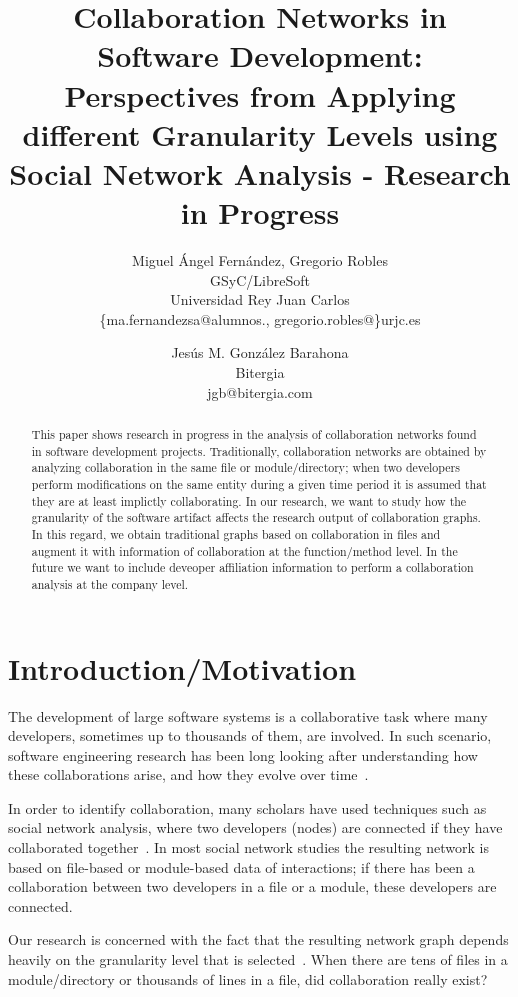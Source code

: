 \documentclass[a4paper]{article}
\title{Collaboration Networks in Software Development: Perspectives from Applying different Granularity Levels using Social Network Analysis - Research in Progress}
\author{
Miguel Ángel Fernández, Gregorio Robles \\ GSyC/LibreSoft \\
                Universidad Rey Juan Carlos \\ \{ma.fernandezsa@alumnos., gregorio.robles@\}urjc.es
\and
Jesús M. González Barahona \\ Bitergia \\
                jgb@bitergia.com
}
\begin{document}
\maketitle

\begin{abstract}
This paper shows research in progress in the analysis of collaboration networks
found in software development projects. Traditionally, collaboration networks
are obtained by analyzing collaboration in the same file or module/directory;
when two developers perform modifications on the same entity during a given time
period it is assumed that they are at least implictly collaborating. In our 
research, we want to study how the granularity of the software artifact affects
the research output of collaboration graphs. In this regard, we obtain traditional
graphs based on collaboration in files and augment it with information of
collaboration at the function/method level. In the future we want to include
deveoper affiliation information to perform a collaboration analysis at the
company level.
\end{abstract}
\vskip 32pt


\section{Introduction/Motivation}

The development of large software systems is a collaborative task where
many developers, sometimes up to thousands of them, are involved. In such 
scenario, software engineering research has been long looking after
understanding how these collaborations arise, and how they evolve over time~\cite{minto2007recommending,singh2010small,surian2010mining,hossain2009social}.

In order to identify collaboration, many scholars have used techniques such as
social network analysis, where two developers (nodes) are connected if they
have collaborated together~\cite{madey2002open,lopez2004applying}. In most social network studies the
resulting network is based on file-based or module-based data of interactions;
if there has been a collaboration between two developers in a file or a module,
these developers are connected. 

Our research is concerned with the fact that the resulting network graph depends
heavily on the granularity level that is selected~\cite{howison2012validity}. When there are tens of files
in a module/directory or thousands of lines in a file, did collaboration really
exist?
\end{document}
